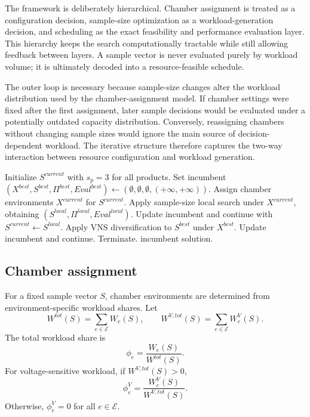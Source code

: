 \documentclass[11pt]{article}
\begin{document}
The framework is deliberately hierarchical. Chamber assignment is treated as a configuration decision, sample-size optimization as a workload-generation decision, and scheduling as the exact feasibility and performance evaluation layer. This hierarchy keeps the search computationally tractable while still allowing feedback between layers. A sample vector is never evaluated purely by workload volume; it is ultimately decoded into a resource-feasible schedule.

The outer loop is necessary because sample-size changes alter the workload distribution used by the chamber-assignment model. If chamber settings were fixed after the first assignment, later sample decisions would be evaluated under a potentially outdated capacity distribution. Conversely, reassigning chambers without changing sample sizes would ignore the main source of decision-dependent workload. The iterative structure therefore captures the two-way interaction between resource configuration and workload generation.

\begin{algorithm}[H]
\caption{Integrated TCSSOP heuristic}
\label{alg:integrated_short}
\begin{algorithmic}[1]
\State Initialize \(S^{current}\) with \(s_p=3\) for all products.
\State Set incumbent \((X^{best},S^{best},\Pi^{best},Eval^{best})\leftarrow(\emptyset,\emptyset,\emptyset,(+\infty,+\infty))\).
    \State Assign chamber environments \(X^{current}\) for \(S^{current}\).
    \State Apply sample-size local search under \(X^{current}\), obtaining \((S^{local},\Pi^{local},Eval^{local})\).
        \State Update incumbent and continue with \(S^{current}\leftarrow S^{local}\).
    \Else
        \State Apply VNS diversification to \(S^{best}\) under \(X^{best}\).
            \State Update incumbent and continue.
        \Else
            \State Terminate.
        \EndIf
    \EndIf
\EndFor
\State \Return incumbent solution.
\end{algorithmic}
\end{algorithm}

\subsection{Chamber assignment}
\label{subsec:chamber_assignment}

For a fixed sample vector \(S\), chamber environments are determined from environment-specific workload shares. Let
\[
W^{tot}(S)=\sum_{e\in\mathcal{E}}W_e(S),
\qquad
W^{V,tot}(S)=\sum_{e\in\mathcal{E}}W_e^V(S).
\]
The total workload share is
\[
\phi_e=\frac{W_e(S)}{W^{tot}(S)}.
\]
For voltage-sensitive workload, if \(W^{V,tot}(S)>0\),
\[
\phi_e^V=\frac{W_e^V(S)}{W^{V,tot}(S)}.
\]
Otherwise, \(\phi_e^V=0\) for all \(e\in\mathcal{E}\).
\end{document}
